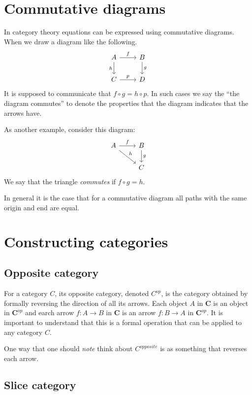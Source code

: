\documentclass{book}
\theoremstyle{definition}
\begin{document}
\section{Commutative diagrams}

In category theory equations can be expressed using commutative diagrams. When
we draw a diagram like the following.
\[
  \begin{tikzcd}
    A \arrow[r, "f"] \arrow[d, "h"']
    & B \arrow[d, "g"] \\
    C \arrow[r, "p"] & D
  \end{tikzcd}
\]
It is supposed to communicate that $f \circ g = h \circ p$. In such cases we
say the ``the diagram commutes'' to denote the properties that the diagram
indicates that the arrows have.

As another example, consider this diagram:
\[
  \begin{tikzcd}
    A \arrow[r, "f"] \arrow[dr, "h"] & B \arrow[d, "g"] \\
                                     & C
  \end{tikzcd}
\]
We say that the triangle \emph{commutes} if $f \circ g = h$.

In general it is the case that for a commutative diagram all paths with the same
origin and end are equal.

\section{Constructing categories}

\subsection{Opposite category}

For a category $C$, its opposite category, denoted $C^{op}$, is the category
obtained by formally reversing the direction of all its arrows. Each object $A$
in $\mathbf{C}$ is an object in $\mathbf{C}^{op}$ and earch arrow $f : A \to B$ in
$\mathbf{C}$ is an arrow $f : B \to A$ in $\mathbf{C}^{op}$. It is important to
understand that this is a formal operation that can be applied to any category
$C$.

One way that one should \emph{note} think about $C^{opposite}$ is as something
that reverses each arrow.

\subsection{Slice category}
\end{document}
